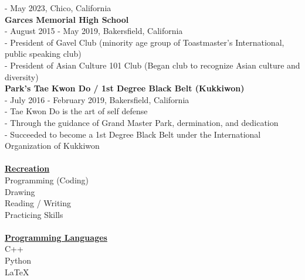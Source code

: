 \documentclass[10pt, letterpaper]{article}                %
\begin{document}
\tab \tab - May 2023, Chico, California\\
\textbf{Garces Memorial High School}\\
\tab \tab - August 2015 - May 2019, Bakersfield, California\\
\tab \tab - President of Gavel Club (minority age group of Toastmaster's International, public speaking club)\\
\tab \tab - President of Asian Culture 101 Club (Began club to recognize Asian culture and diversity)\\
\textbf{Park's Tae Kwon Do / 1st Degree Black Belt (Kukkiwon)}\\
\tab \tab - July 2016 - February 2019, Bakersfield, California\\
\tab \tab - Tae Kwon Do is the art of self defense\\
\tab \tab - Through the guidance of Grand Master Park, dermination, and dedication\\
\tab \tab - Succeeded to become a 1st Degree Black Belt under the International Organization of Kukkiwon\\
\\
\textbf{\underline{Recreation}}\\
Programming (Coding)\\
Drawing\\
Reading / Writing\\
Practicing Skills\\
\\
\textbf{\underline{Programming Languages}}\\
C++\\
Python\\
LaTeX\\
\\
\end{document}
